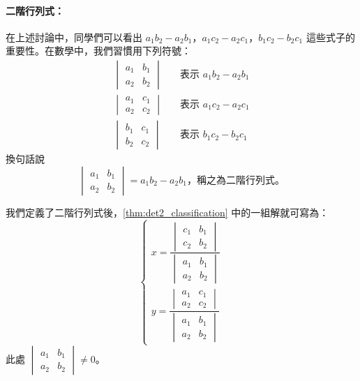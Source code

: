 \paragraph{二階行列式：}
在上述討論中，同學們可以看出 $a_1 b_2 - a_2 b_1$，$a_1 c_2 - a_2 c_1$，$b_1 c_2 - b_2 c_1$ 這些式子的重要性。在數學中，我們習慣用下列符號：
\begin{align*}
  \begin{vmatrix} a_1 & b_1 \\ a_2 & b_2 \end{vmatrix} \quad &\text{表示 } a_1 b_2 - a_2 b_1 \\
  \begin{vmatrix} a_1 & c_1 \\ a_2 & c_2 \end{vmatrix} \quad &\text{表示 } a_1 c_2 - a_2 c_1 \\
  \begin{vmatrix} b_1 & c_1 \\ b_2 & c_2 \end{vmatrix} \quad &\text{表示 } b_1 c_2 - b_2 c_1
\end{align*}
換句話說
\begin{equation*}
  \begin{vmatrix} a_1 & b_1 \\ a_2 & b_2 \end{vmatrix} = a_1 b_2 - a_2 b_1 \text{，稱之為二階行列式。}
\end{equation*}

我們定義了二階行列式後，\cref{thm:det2_classification} 中的一組解就可寫為：
\begin{equation*}
\begin{cases}
  x = \dfrac{\begin{vmatrix} c_1 & b_1 \\ c_2 & b_2 \end{vmatrix}}{\begin{vmatrix} a_1 & b_1 \\ a_2 & b_2 \end{vmatrix}} \\[2em]
  y = \dfrac{\begin{vmatrix} a_1 & c_1 \\ a_2 & c_2 \end{vmatrix}}{\begin{vmatrix} a_1 & b_1 \\ a_2 & b_2 \end{vmatrix}}
\end{cases}
\end{equation*}
此處 $\begin{vmatrix} a_1 & b_1 \\ a_2 & b_2 \end{vmatrix} \neq 0$。


